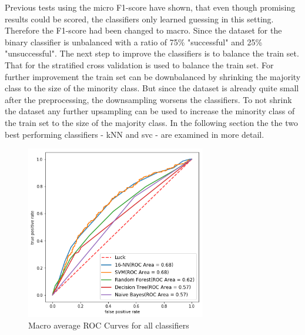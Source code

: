 Previous tests using the micro F1-score have shown, that even though promising results could be scored, the classifiers only learned guessing in this setting. Therefore the F1-score had been changed to macro.
 Since the dataset for the binary classifier is unbalanced with a ratio of 75\% "successful" and 25\% "unsuccessful". The next step to improve the classifiers is to balance the train set. That for the stratified cross validation is used to balance the train set. For further improvement the train set can be downbalanced by shrinking the majority class to the size of the minority class. But since the dataset is already quite small after the preprocessing, the downsampling worsens the classifiers. To not shrink the dataset any further upsampling can be used to increase the minority class of the train set to the size of the majority class. In the following section the the two best performing classifiers - kNN and svc - are examined in more detail.
\begin{figure}[h]
	\center
	\includegraphics[width=0.7\textwidth]{images/roc.png}
	\caption{Macro average ROC Curves for all classifiers}
	\label{img:roc}
\end{figure}
 

